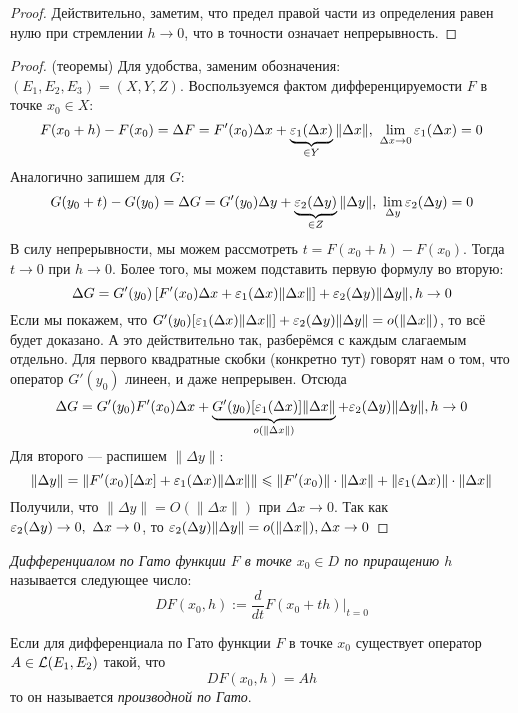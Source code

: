 \begin{proof}
	Действительно, заметим, что предел правой части из определения равен нулю при стремлении $h \to 0$, что в точности означает непрерывность.
\end{proof}

\begin{proof} (теоремы)
	Для удобства, заменим обозначения: $(E_1, E_2, E_3) = (X, Y, Z)$. Воспользуемся фактом дифференцируемости $F$ в точке $x_0 \in X$:
	\[
		F(x_0 + h) - F(x_0) = \Delta F = F'(x_0)\Delta x + \underbrace{\eps_1(\Delta x)}_{\in Y}\|\Delta x\|,\ \lim_{\Delta x \to 0} \eps_1(\Delta x) = 0
	\]
	Аналогично запишем для $G$:
	\[
		G(y_0 + t) - G(y_0) = \Delta G = G'(y_0)\Delta y + \underbrace{\eps_2(\Delta y)}_{\in Z}\|\Delta y\|,\ \lim_{\Delta y} \eps_2(\Delta y) = 0
	\]
	В силу непрерывности, мы можем рассмотреть $t = F(x_0 + h) - F(x_0)$. Тогда $t \to 0$ при $h \to 0$. Более того, мы можем подставить первую формулу во вторую:
	\[
		\Delta G = G'(y_0)\left[F'(x_0)\Delta x + \varepsilon_1(\Delta x)\|\Delta x\|\right] + \varepsilon_2(\Delta y)\|\Delta y\|, h \to 0
	\]
	Если мы покажем, что $G'(y_0)[\varepsilon_1(\Delta x)\|\Delta x\|] + \varepsilon_2(\Delta y)\|\Delta y\| = o(\|\Delta x\|)$, то всё будет доказано. А это действительно так, разберёмся с каждым слагаемым отдельно. Для первого квадратные скобки (конкретно тут) говорят нам о том, что оператор $G'(y_0)$ линеен, и даже непрерывен. Отсюда
	\[
		\Delta G = G'(y_0)F'(x_0)\Delta x + \underbrace{G'(y_0)[\varepsilon_1(\Delta x)]\|\Delta x\|}_{o(\|\Delta x\|)} + \varepsilon_2(\Delta y)\|\Delta y\|, h \to 0
	\]
	Для второго --- распишем $\|\Delta y\|$:
	\[
		\|\Delta y\| = \|F'(x_0)[\Delta x] + \varepsilon_1(\Delta x)\|\Delta x\|\| \leqslant \|F'(x_0)\| \cdot \|\Delta x\| + \|\varepsilon_1(\Delta x)\| \cdot \|\Delta x\|
	\]
	Получили, что $\|\Delta y\| = O(\|\Delta x\|)$ при $\Delta x \to 0$. Так как $\varepsilon_2(\Delta y) \to 0,\ \Delta x \to 0$, то $\varepsilon_2(\Delta y)\|\Delta y\| = o(\|\Delta x\|), \Delta x \to 0$
\end{proof}

\begin{definition}
	\textit{Дифференциалом по Гато функции $F$ в точке $x_0 \in D$ по приращению $h$} называется следующее число:
	\[
		DF(x_0, h) := \frac{d}{dt}F(x_0 + th)|_{t = 0}
	\]
\end{definition}

\begin{definition}
	Если для дифференциала по Гато функции $F$ в точке $x_0$ существует оператор $A \in \mathcal{L}(E_1, E_2)$ такой, что
	\[
		DF(x_0, h) = Ah
	\]
	то он называется \textit{производной по Гато}.
\end{definition}

